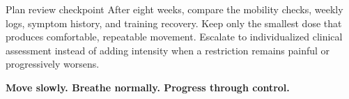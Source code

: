 \documentclass[10pt,letterpaper]{article}
\begin{document}
\begin{callout}{Plan review checkpoint}
After eight weeks, compare the mobility checks, weekly logs, symptom history, and training recovery. Keep only the smallest dose that produces comfortable, repeatable movement. Escalate to individualized clinical assessment instead of adding intensity when a restriction remains painful or progressively worsens.
\end{callout}

\vfill
\begin{center}
{\color{Midnight}\bfseries Move slowly. Breathe normally. Progress through control.}
\end{center}
\end{document}
